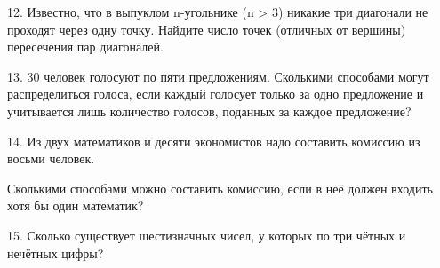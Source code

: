 12. Известно, что в выпуклом n-угольнике (n > 3) никакие три диагонали не проходят через одну точку.
Найдите число точек (отличных от вершины) пересечения пар диагоналей.

13. 30 человек голосуют по пяти предложениям. Сколькими способами могут распределиться голоса, если каждый голосует только за одно предложение и учитывается лишь количество голосов, поданных за каждое предложение?

14. Из двух математиков и десяти экономистов надо составить комиссию из восьми человек.

Сколькими способами можно составить комиссию, если в неё должен входить хотя бы один математик?

15. Сколько существует шестизначных чисел, у которых по три чётных и нечётных цифры?